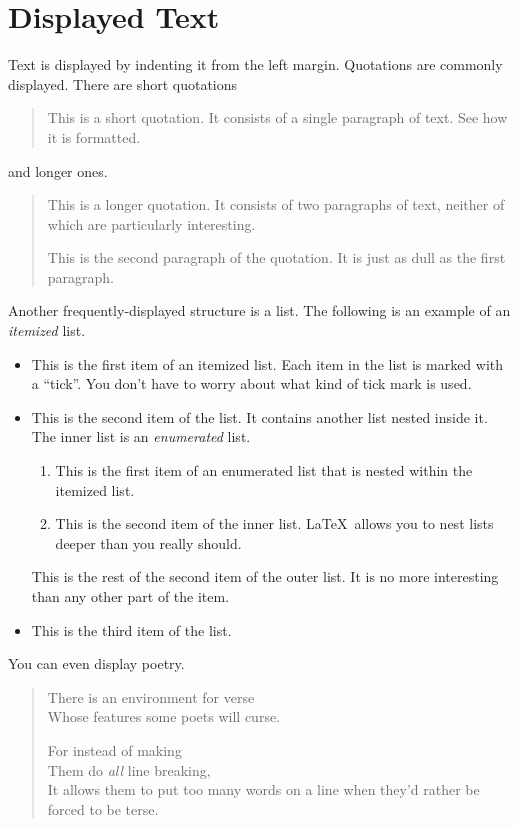 \documentclass{article}      %
\begin{document}
\section{Displayed Text}

Text is displayed by indenting it from the left
margin.  Quotations are commonly displayed.  There
are short quotations
\begin{quote}
   This is a short quotation.  It consists of a 
   single paragraph of text.  See how it is formatted.
\end{quote}
and longer ones.
\begin{quotation}
   This is a longer quotation.  It consists of two
   paragraphs of text, neither of which are
   particularly interesting.

   This is the second paragraph of the quotation.  It
   is just as dull as the first paragraph.
\end{quotation}
Another frequently-displayed structure is a list.
The following is an example of an \emph{itemized}
list.
\begin{itemize}
   \item This is the first item of an itemized list.
         Each item in the list is marked with a ``tick''.
         You don't have to worry about what kind of tick
         mark is used.

   \item This is the second item of the list.  It
         contains another list nested inside it.  The inner
         list is an \emph{enumerated} list.
         \begin{enumerate}
            \item This is the first item of an enumerated 
                  list that is nested within the itemized list.

            \item This is the second item of the inner list.  
                  \LaTeX\ allows you to nest lists deeper than 
                  you really should.
         \end{enumerate}
         This is the rest of the second item of the outer
         list.  It is no more interesting than any other
         part of the item.
   \item This is the third item of the list.
\end{itemize}
You can even display poetry.
\begin{verse}
   There is an environment 
    for verse \\             %
   Whose features some poets %
   will curse.   


   For instead of making\\
   Them do \emph{all} line breaking, \\
   It allows them to put too many words on a line when they'd rather be 
   forced to be terse.
\end{verse}
\end{document}
